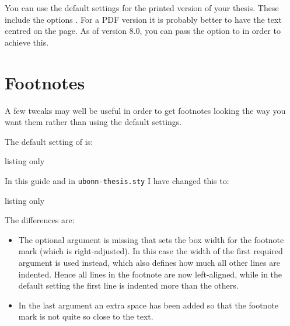 You can use the default settings for the printed version of your thesis.
These include the \KOMAScript options .
For a PDF version it is probably better to have the text centred on the page.
As of version 8.0, you can pass the option  to 
in order to achieve this.


\section{Footnotes}%
\label{sec:layout:footnote}

A few tweaks may well be useful in order to get footnotes looking the
way you want them rather than using the default \KOMAScript{}
settings.

The default setting of \KOMAScript{} is:
\begin{tcblisting}{listing only}
\end{tcblisting}
\noindent In this guide and in \texttt{ubonn-thesis.sty} I have changed this to:
\begin{tcblisting}{listing only}
\end{tcblisting}
\noindent The differences are:
\begin{itemize}
\item The optional argument is missing that sets the box width for the
  footnote mark (which is right-adjusted). In this case the width of
  the first required argument is used instead, which also defines how
  much all other lines are indented. Hence all lines in the footnote
  are now left-aligned, while in the default setting the first line is
  indented more than the others.
\item In the last argument an extra space has been added so that the
  footnote mark is not quite so close to the text.
\end{itemize}

